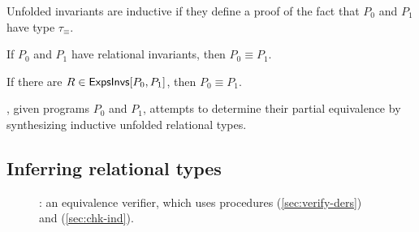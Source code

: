 Unfolded invariants are inductive if they define a proof of the fact
that $P_0$ and $P_1$ have type $\tau_{\equiv}$.
% 
\begin{defn}
  \label{defn:ind-unfolded}
\end{defn}

If $P_0$ and $P_1$ have relational invariants, then $P_0 \equiv P_1$.
%
\begin{lemma}
  \label{lemma:equiv-evidence}
  If there are $R \in \mathsf{ExpsInvs}[ P_0, P_1 ]$, then $P_0 \equiv P_1$.
\end{lemma}
%
\sys, given programs $P_0$ and $P_1$, attempts to determine their
partial equivalence by synthesizing inductive unfolded relational
types.

\subsection{Inferring relational types}
\label{sec:infer-rel-types}

\begin{figure}
  \centering
\begin{algorithm}[H]
  { 
  }
  \caption{%
    \verify: an equivalence verifier, which uses procedures
    \verifybnd (\autoref{sec:verify-ders}) and %
    \chkinductive (\autoref{sec:chk-ind}).  }
  \label{alg:infer}
\end{algorithm}
\end{figure}

